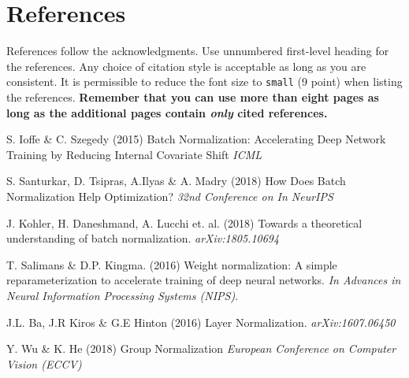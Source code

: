 \documentclass{article}
\begin{document}
\newpage
\section*{References}

References follow the acknowledgments. Use unnumbered first-level heading for
the references. Any choice of citation style is acceptable as long as you are
consistent. It is permissible to reduce the font size to \verb+small+ (9 point)
when listing the references. {\bf Remember that you can use more than eight
  pages as long as the additional pages contain \emph{only} cited references.}
\medskip

\small



S. Ioffe \& C. Szegedy (2015) Batch Normalization: Accelerating Deep Network Training by Reducing Internal Covariate Shift \textit{ICML}

S. Santurkar, D. Tsipras, A.Ilyas \& A. Madry (2018) How Does Batch Normalization Help Optimization? \textit{32nd Conference on In NeurIPS}

J. Kohler, H. Daneshmand, A. Lucchi et. al. (2018) Towards a theoretical understanding of batch normalization. 	\textit{arXiv:1805.10694}

T. Salimans \& D.P. Kingma. (2016) Weight normalization: A simple reparameterization to accelerate
training of deep neural networks. \textit{In Advances in Neural Information Processing Systems (NIPS)}.

J.L. Ba, J.R Kiros \& G.E Hinton (2016) Layer Normalization. \textit{arXiv:1607.06450}

Y. Wu \& K. He (2018) Group Normalization \textit{European Conference on Computer Vision (ECCV)}
\end{document}
